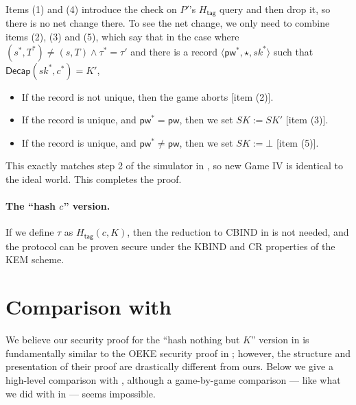\documentclass{article}
\theoremstyle{plain}
\theoremstyle{definition}
\theoremstyle{remark}
\newcommand{\Decap}{\mathsf{Decap}}
\newcommand{\Htag}{H_\mathsf{tag}}
\newcommand{\pw}{\mathsf{pw}}
\begin{document}
Items (1) and (4) introduce the check on $P'$'s $\Htag$ query and then drop it, so there is no net change there. To see the net change, we only need to combine items (2), (3) and (5), which say that in the case where $(s^*,T^*) \neq (s,T) \land \tau^* = \tau'$ and there is a record $\langle\pw^*,\star,sk^*\rangle$ such that $\Decap(sk^*,c^*) = K'$,
\begin{itemize}
  \item If the record is not unique, then the game aborts [item (2)].
  \item If the record is unique, and $\pw^* = \pw$, then we set $SK := SK'$ [item (3)].
  \item If the record is unique, and $\pw^* \neq \pw$, then we set $SK := \bot$ [item (5)].
\end{itemize}
This exactly matches step 2 of the simulator in , so new Game IV is identical to the ideal world. This completes the proof.

\paragraph{The ``hash $c$'' version.}
If we define $\tau$ as $\Htag(c,K)$, then the reduction to CBIND in  is not needed, and the protocol can be proven secure under the KBIND and CR properties of the KEM scheme.

\section{Comparison with \cite{EC:JanRoyXu25}}
\label{app:jrx-comparison}
We believe our security proof for the ``hash nothing but $K$'' version in  is fundamentally similar to the OEKE security proof in \cite{EC:JanRoyXu25}; however, the structure and presentation of their proof are drastically different from ours. Below we give a high-level comparison with \cite{EC:JanRoyXu25}, although a game-by-game comparison --- like what we did with \cite{EPRINT:ArrBarJar25} in  --- seems impossible.
\end{document}
